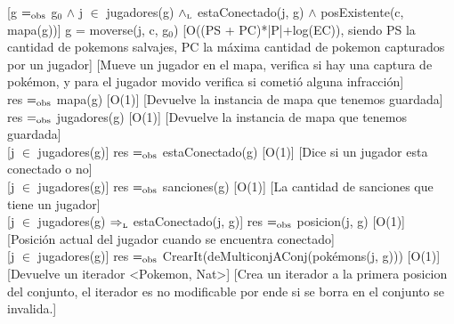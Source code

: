 [g $=_{\mathrm{obs}}$ g$_0$ $\wedge$ j $\in$ jugadores(g) $\land_{\mathrm{\scriptscriptstyle{L}}}$ estaConectado(j, g) $\wedge$ posExistente(c, mapa(g))]
{g = moverse(j, c, g$_0$)}
[O((PS + PC)*|P|+log(EC)), siendo PS la cantidad de pokemons salvajes, PC la máxima cantidad de pokemon capturados por un jugador]
[Mueve un jugador en el mapa, verifica si hay una captura de pokémon, y para el jugador movido verifica si cometió alguna infracción]\\


{res $=_{\mathrm{obs}}$ mapa(g)}
[O(1)]
[Devuelve la instancia de mapa que tenemos guardada]
\\

{res $=_{\mathrm{obs}}$ jugadores(g)}
[O(1)]
[Devuelve la instancia de mapa que tenemos guardada]
\\

[j $\in$ jugadores(g)]
{res $=_{\mathrm{obs}}$ estaConectado(g)}
[O(1)]
[Dice si un jugador esta conectado o no]
\\

[j $\in$ jugadores(g)]
{res $=_{\mathrm{obs}}$ sanciones(g)}
[O(1)]
[La cantidad de sanciones que tiene un jugador]
\\

[j $\in$ jugadores(g) $\Rightarrow_{\mathrm{\scriptscriptstyle{L}}}$ estaConectado(j, g)]
{res $=_{\mathrm{obs}}$ posicion(j, g)}
[O(1)]
[Posici\'on actual del jugador cuando se encuentra conectado]
\\

[j $\in$ jugadores(g)]
{res $=_{\mathrm{obs}}$ CrearIt(deMulticonjAConj(pok\'emons(j, g)))}
[O(1)]
[Devuelve un iterador <Pokemon, Nat>]
[Crea un iterador a la primera posicion del conjunto, el iterador es no modificable por ende si se borra en el conjunto se invalida.]
\\




